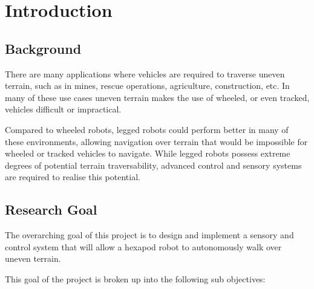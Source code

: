 \chapter{Introduction}

\section{Background}

    There are many applications where vehicles are required to traverse uneven terrain, such as in mines, rescue operations, agriculture, construction, etc. In many of these
    use cases uneven terrain makes the use of wheeled, or even tracked, vehicles difficult or impractical.

    Compared to wheeled robots, legged robots could perform better in many of these environments, allowing navigation over terrain that would be impossible for wheeled or
    tracked vehicles to navigate. While legged robots possess extreme degrees of potential terrain traversability, advanced control and sensory systems are required to 
    realise this potential.


\section{Research Goal}
    The overarching goal of this project is to design and implement a sensory and control system that will allow a hexapod robot to autonomously walk over uneven terrain.

    This goal of the project is broken up into the following sub objectives:

